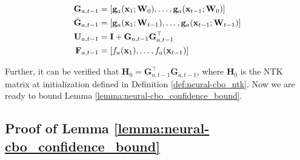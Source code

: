 \begin{equation*}
\label{def:neural_cbo_linear_kernelized_terms}
    \begin{split}   
\mathbf{G}_{a,t-1} & = [\mathbf{g}_{a}(\mathbf{x}_1; \mathbf{W}_0),\dots, \mathbf{g}_{a}(\mathbf{x}_{t-1}; \mathbf{W}_0)]  
\\
\Bar{\mathbf{G}}_{a,t-1} & = [\mathbf{g}_{a}(\mathbf{x}_1; \mathbf{W}_{t-1}),\dots, \mathbf{g}_{a}(\mathbf{x}_{t-1}; \mathbf{W}_{t-1})] 
\\
\mathbf{U}_{a,t-1} &=  \mathbf{I} + \mathbf{G}_{a,t-1} \mathbf{G}_{a,t-1}^\top 
\\
\mathbf{F}_{a,t-1} &= [f_a(\mathbf{x}_1), \dots, f_a(\mathbf{x}_{t-1})] 
    \end{split}
\end{equation*}

Further, it can be verified that $\mathbf{H}_0 = \mathbf{G}_{a,t-1} ^\top\mathbf{G}_{a,t-1}$, where $\mathbf{H}_0$ is the NTK matrix at initialization defined in Definition \ref{def:neural-cbo_ntk}.  Now we are ready to bound Lemma \ref{lemma:neural-cbo_confidence_bound}.
\subsection{Proof of Lemma \ref{lemma:neural-cbo_confidence_bound}}
\ConfidenceBound*

